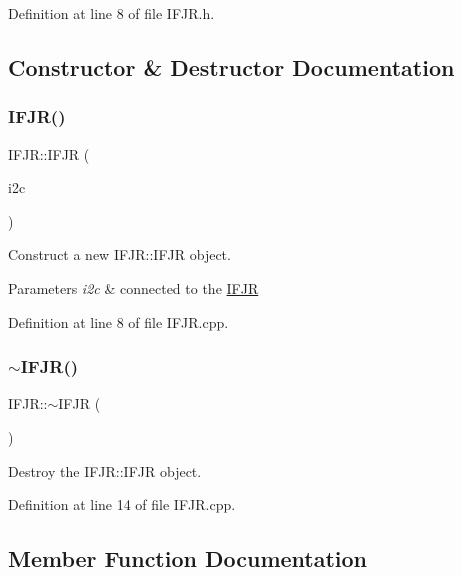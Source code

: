 Definition at line 8 of file I\+F\+J\+R.\+h.



\subsection{Constructor \& Destructor Documentation}
\mbox{\label{class_i_f_j_r_a1905b6c95f25b84526531afcfeb38b93}} 
\subsubsection{\texorpdfstring{IFJR()}{IFJR()}}
{\footnotesize\ttfamily I\+F\+J\+R\+::\+I\+F\+JR (\begin{DoxyParamCaption}\item[{I2C \&}]{i2c }\end{DoxyParamCaption})}



Construct a new I\+F\+J\+R\+::\+I\+F\+JR object. 


\begin{DoxyParams}{Parameters}
{\em i2c} & connected to the \mbox{\hyperlink{class_i_f_j_r}{I\+F\+JR}} \\
\hline
\end{DoxyParams}


Definition at line 8 of file I\+F\+J\+R.\+cpp.

\mbox{\label{class_i_f_j_r_a02cc4eb03b4a7fdacbdb8e7f940b7daa}} 
\subsubsection{\texorpdfstring{$\sim$IFJR()}{~IFJR()}}
{\footnotesize\ttfamily I\+F\+J\+R\+::$\sim$\+I\+F\+JR (\begin{DoxyParamCaption}{ }\end{DoxyParamCaption})}



Destroy the I\+F\+J\+R\+::\+I\+F\+JR object. 



Definition at line 14 of file I\+F\+J\+R.\+cpp.



\subsection{Member Function Documentation}
\mbox{\label{class_i_f_j_r_a0a7d913d00e8573b613b980f17ed2fd4}} 
